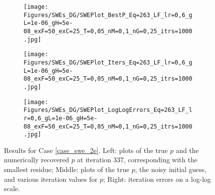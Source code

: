 \begin{figure}[H]
    \begin{subfigure}[t]{0.32\textwidth}
        \centering
        \texttt{[image: Figures/SWEs\_DG/SWEPlot\_BestP\_Eq=263\_LF\_lr=0,6\_gL=1e-06\_gH=5e-08\_exF=50\_exC=25\_T=0,05\_nM=0,1\_nG=0,25\_itrs=1000.jpg]}
    \end{subfigure}
    \begin{subfigure}[t]{0.32\textwidth}
        \centering
        \texttt{[image: Figures/SWEs\_DG/SWEPlot\_Iters\_Eq=263\_LF\_lr=0,6\_gL=1e-06\_gH=5e-08\_exF=50\_exC=25\_T=0,05\_nM=0,1\_nG=0,25\_itrs=1000.jpg]}
    \end{subfigure}
    \begin{subfigure}[t]{0.32\textwidth}
        \texttt{[image: Figures/SWEs\_DG/SWEPlot\_LogLogErrors\_Eq=263\_LF\_lr=0,6\_gL=1e-06\_gH=5e-08\_exF=50\_exC=25\_T=0,05\_nM=0,1\_nG=0,25\_itrs=1000.jpg]}
    \end{subfigure}
    \caption{Results for Case \eqref{case_swe_2e}. %
    Left: plots of the true $p$ and the numerically recovered $p$ at iteration 337, corresponding with the smallest residue; Middle: plots of the true $p$, the noisy initial guess, and various iteration values for $p$; Right: iteration errors on a log-log scale.
    }
    \label{fig:swe_2E}
\end{figure}


